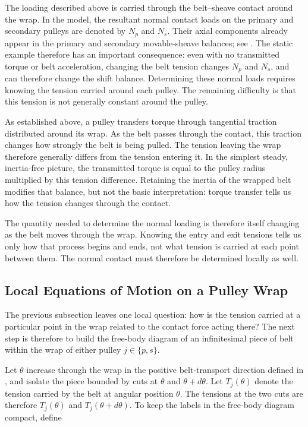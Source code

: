 \documentclass[11pt]{report}
\numberwithin{equation}{section}
\begin{document}
The loading described above is carried through the belt--sheave contact around
the wrap. In the model, the resultant normal contact loads on the primary and
secondary pulleys are denoted by \(N_p\) and \(N_s\). Their axial components
already appear in the primary and secondary movable-sheave balances; see
.
The static example therefore has an important consequence: even with no
transmitted torque or belt acceleration, changing the belt tension changes
\(N_p\) and \(N_s\), and can therefore change the shift balance. Determining
these normal loads requires knowing the tension carried around each pulley.
The remaining difficulty is that this tension is not generally constant around
the pulley.

As established above, a pulley transfers torque through tangential traction
distributed around its wrap. As the belt passes through the contact, this
traction changes how strongly the belt is being pulled. The tension leaving
the wrap therefore generally differs from the tension entering it. In the
simplest steady, inertia-free picture, the transmitted torque is equal to the
pulley radius multiplied by this tension difference. Retaining the inertia of
the wrapped belt modifies that balance, but not the basic interpretation:
torque transfer tells us how the tension changes through the contact.

The quantity needed to determine the normal loading is therefore itself
changing as the belt moves through the wrap. Knowing the entry and exit
tensions tells us only how that process begins and ends, not what tension is
carried at each point between them. The normal contact must therefore be
determined locally as well.

\subsection{Local Equations of Motion on a Pulley Wrap}
\label{sec:local_wrap_dynamics}

The previous subsection leaves one local question: how is the tension carried
at a particular point in the wrap related to the contact force acting there?
The next step is therefore to build the free-body diagram of an infinitesimal
piece of belt within the wrap of either pulley \(j\in\{p,s\}\).

Let \(\theta\) increase through the wrap in the positive belt-transport
direction defined in , and isolate the piece bounded
by cuts at \(\theta\) and \(\theta+d\theta\). Let \(T_j(\theta)\) denote the
tension carried by the belt at angular position \(\theta\). The tensions at
the two cuts are therefore \(T_j(\theta)\) and
\(T_j(\theta+d\theta)\). To keep the labels in the free-body diagram compact,
define
\end{document}
